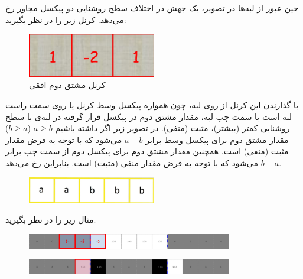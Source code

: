 \documentclass{article}
\begin{document}
\section{}%
حین عبور از لبه‌ها در تصویر، یک جهش در اختلاف سطح روشنایی دو پیکسل مجاور رخ می‌دهد. کرنل زیر را در نظر بگیرید:
\begin{figure}[H]
    \centering
    \includegraphics[width=0.5\textwidth]{figures/2a.jpg}
    \caption
	{
کرنل مشتق دوم افقی
	}
    \label{fig:fig1}
\end{figure}
با گذارندن این کرنل از روی لبه، چون همواره پیکسل وسط کرنل یا روی سمت راست لبه است یا سمت چپ لبه، مقدار مشتق دوم در پیکسل قرار گرفته در لبه‌ی با سطح روشنایی کمتر (بیشتر)، مثبت (منفی). در تصویر زیر اگر داشته باشیم
 $a \ge b$ ($b \ge a$) 
مقدار مشتق دوم برای پیکسل وسط برابر $a-b$ می‌شود که با توجه به فرض مقدار مثبت (منفی) است. همچنین مقدار مشتق دوم برای پیکسل دوم از سمت چپ برابر $b-a$ می‌شود که با توجه به فرض مقدار منفی (مثبت) است. بنابراین  رخ می‌دهد.
\begin{figure}[H]
    \centering
    \includegraphics[width=0.5\textwidth]{figures/2c.jpg}
    \caption
	{}
    \label{fig:fig1}
\end{figure}
مثال زیر را در نظر بگیرید.
\begin{figure}[H]
    \centering
    \includegraphics[width=0.8\textwidth]{figures/2d.jpg}
    \caption
	{}
    \label{fig:fig1}
\end{figure}
\begin{figure}[H]
    \centering
    \includegraphics[width=0.8\textwidth]{figures/2e.jpg}
    \caption
	{}
    \label{fig:fig1}
\end{figure}

\section{}%
\end{document}
